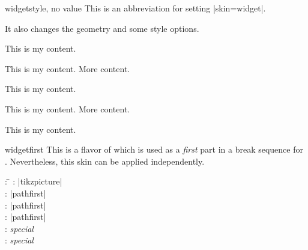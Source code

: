 \begin{docTcbKey}{widget}{}{style, no value}
  This is an abbreviation for setting |skin=widget|.
  \begin{marker}It also changes the geometry and some style options.\end{marker}
\end{docTcbKey}


\begin{dispExample}
\begin{tcbraster}[widget,raster equal height,raster columns=4,
    colback=LightGreen,colframe=DarkGreen,
    left=1mm,right=1mm,top=1mm,bottom=1mm,middle=1mm]
  \begin{tcolorbox}
    This is my content.
  \end{tcolorbox}
  \begin{tcolorbox}
    This is my content.
    \tcblower
    More content.
  \end{tcolorbox}
  \begin{tcolorbox}[adjusted title=My title]
    This is my content.
  \end{tcolorbox}
  \begin{tcolorbox}[adjusted title=My title]
    This is my content.
    \tcblower
    More content.
  \end{tcolorbox}
\end{tcbraster}
\end{dispExample}


\begin{dispExample}
\begin{tcolorbox}[widget,colback=Salmon!50!white,colframe=FireBrick!75!black,
  adjusted title=A colored box with the 'widget' skin]
This is my content.
\end{tcolorbox}
\end{dispExample}



\begin{docSkin}{widgetfirst}
This is a flavor of  which is used as a \emph{first} part
in a break sequence for .
Nevertheless, this skin can be applied independently.
\begin{tcolorbox}[skintable=widgetfirst]
  \begin{tabbing}
    : \=\kill
    :  \> |tikzpicture|\\ 
    :           \> |pathfirst|\\
    : \> |pathfirst|\\ 
    :        \> |pathfirst|\\
    :    \> \emph{special}\\
    :           \> \emph{special}
  \end{tabbing}
\end{tcolorbox}
\end{docSkin}


